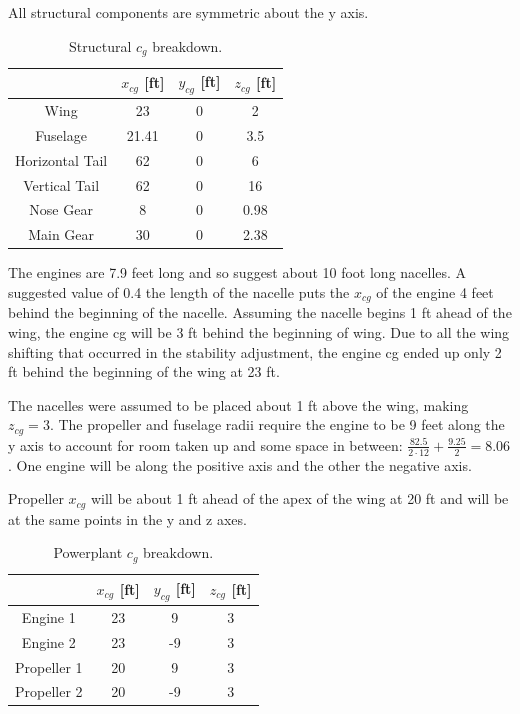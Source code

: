 \documentclass[conf]{new-aiaa}
\begin{document}
All structural components are symmetric about the y axis.
\begin{table}[H]
\centering
\label{tab:Structural cg}
\caption{Structural $c_g$ breakdown.}
\begin{tabular}{|c|c|c|c|}\hline
	& $x_{cg}$ [ft] & $y_{cg}$ [ft] & $z_{cg}$ [ft] \\ \hline
Wing & 23 & 0 & 2\\ \hline
Fuselage & 21.41 & 0 & 3.5\\ \hline
Horizontal Tail & 62 & 0 & 6\\ \hline
Vertical Tail & 62	& 0 & 16\\ \hline
Nose Gear & 8 & 0 & 0.98\\ \hline
Main Gear & 30 & 0 & 2.38\\ \hline 
\end{tabular}
\end{table}


The engines are 7.9 feet long and so suggest about 10 foot long nacelles. A suggested value of 0.4 the length of the nacelle \cite{pres19} puts the $x_{cg}$ of the engine 4 feet behind the beginning of the nacelle. Assuming the nacelle begins 1 ft ahead of the wing, the engine cg will be 3 ft behind the beginning of wing. Due to all the wing shifting that occurred in the stability adjustment, the engine cg ended up only 2 ft behind the beginning of the wing at 23 ft. 

The nacelles were assumed to be placed about 1 ft above the wing, making $z_{cg} = 3$. The propeller and fuselage radii require the engine to be 9 feet along the y axis to account for room taken up and some space in between: $\frac{82.5}{2\cdot12}+\frac{9.25}{2}=8.06$. One engine will be along the positive axis and the other the negative axis.

Propeller $x_{cg}$ will be about 1 ft ahead of the apex of the wing at 20 ft and will be at the same points in the y and z axes.

\begin{table}[H]
\centering
\label{tab:Powerplant cg}
\caption{Powerplant $c_g$ breakdown.}
\begin{tabular}{|c|c|c|c|}\hline
	& $x_{cg}$ [ft] & $y_{cg}$ [ft] & $z_{cg}$ [ft] \\ \hline
Engine 1 & 23 & 9 & 3\\ \hline
Engine 2 & 23 & -9 & 3\\ \hline
Propeller 1 & 20 & 9 & 3 \\ \hline
Propeller 2 & 20 & -9 & 3\\ \hline
\end{tabular}
\end{table}
\end{document}
